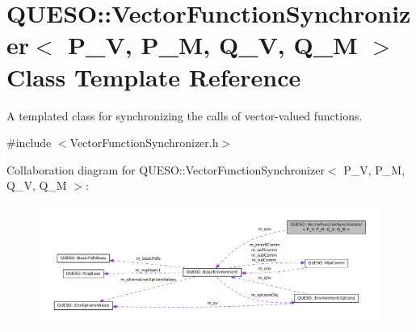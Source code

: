 \hypertarget{class_q_u_e_s_o_1_1_vector_function_synchronizer}{\section{Q\-U\-E\-S\-O\-:\-:Vector\-Function\-Synchronizer$<$ P\-\_\-\-V, P\-\_\-\-M, Q\-\_\-\-V, Q\-\_\-\-M $>$ Class Template Reference}
\label{class_q_u_e_s_o_1_1_vector_function_synchronizer}
}


A templated class for synchronizing the calls of vector-\/valued functions.  




{\ttfamily \#include $<$Vector\-Function\-Synchronizer.\-h$>$}



Collaboration diagram for Q\-U\-E\-S\-O\-:\-:Vector\-Function\-Synchronizer$<$ P\-\_\-\-V, P\-\_\-\-M, Q\-\_\-\-V, Q\-\_\-\-M $>$\-:
\nopagebreak
\begin{figure}[H]
\begin{center}
\leavevmode
\includegraphics[width=350pt]{class_q_u_e_s_o_1_1_vector_function_synchronizer__coll__graph}
\end{center}
\end{figure}
